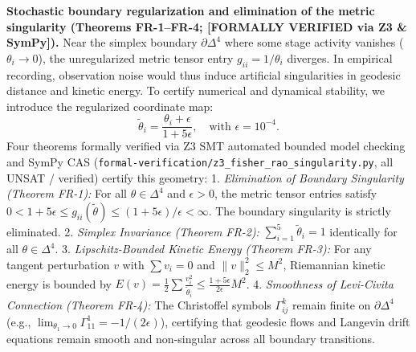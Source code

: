 \documentclass[
]{article}
\begin{document}
\textbf{Stochastic boundary regularization and elimination of the metric
singularity (Theorems FR-1--FR-4; {[}FORMALLY VERIFIED via Z3 \&
SymPy{]}).} Near the simplex boundary \(\partial \Delta^4\) where some
stage activity vanishes (\(\theta_i \to 0\)), the unregularized metric
tensor entry \(g_{ii} = 1/\theta_i\) diverges. In empirical recording,
observation noise would thus induce artificial singularities in geodesic
distance and kinetic energy. To certify numerical and dynamical
stability, we introduce the regularized coordinate map:
\begin{equation}
\tilde{\theta}_i = \frac{\theta_i + \epsilon}{1 + 5\epsilon}, \quad \text{with } \epsilon = 10^{-4}.
\label{eq:theta_reg}
\end{equation}
Four theorems formally verified via Z3 SMT automated bounded model
checking and SymPy CAS
(\texttt{formal-verification/z3\_fisher\_rao\_singularity.py}, all UNSAT
/ verified) certify this geometry: 1. \emph{Elimination of Boundary
Singularity (Theorem FR-1):} For all \(\theta \in \Delta^4\) and
\(\epsilon > 0\), the metric tensor entries satisfy
\(0 < 1 + 5\epsilon \le g_{ii}(\tilde{\theta}) \le (1 + 5\epsilon)/\epsilon < \infty\).
The boundary singularity is strictly eliminated. 2. \emph{Simplex
Invariance (Theorem FR-2):} \(\sum_{i=1}^5 \tilde{\theta}_i = 1\)
identically for all \(\theta \in \Delta^4\). 3. \emph{Lipschitz-Bounded
Kinetic Energy (Theorem FR-3):} For any tangent perturbation \(v\) with
\(\sum v_i = 0\) and \(\|v\|_2^2 \le M^2\), Riemannian kinetic energy is
bounded by
\(E(v) = \frac{1}{2} \sum \frac{v_i^2}{\tilde{\theta}_i} \le \frac{1+5\epsilon}{2\epsilon} M^2\).
4. \emph{Smoothness of Levi-Civita Connection (Theorem FR-4):} The
Christoffel symbols \(\Gamma^k_{ij}\) remain finite on
\(\partial \Delta^4\) (e.g.,
\(\lim_{\theta_1 \to 0} \Gamma^1_{11} = -1/(2\epsilon)\)), certifying
that geodesic flows and Langevin drift equations remain smooth and
non-singular across all boundary transitions.
\end{document}
